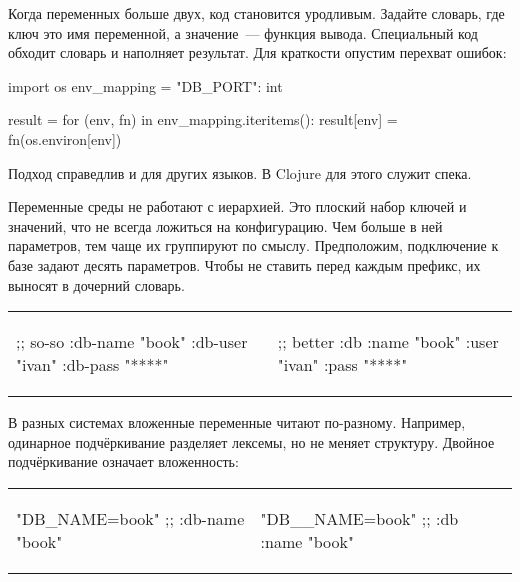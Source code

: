 Когда переменных больше двух, код становится уродливым. Задайте словарь, где
ключ это имя переменной, а значение~--- функция вывода. Специальный код обходит
словарь и наполняет результат. Для краткости опустим перехват ошибок:

\begin{english}
  \begin{python}
import os
env_mapping = {"DB_PORT": int}

result = {}
for (env, fn) in env_mapping.iteritems():
    result[env] = fn(os.environ[env])
  \end{python}
\end{english}

\noindent
Подход справедлив и для других языков. В Clojure для этого служит спека.

Переменные среды не работают с иерархией. Это плоский набор ключей и значений,
что не всегда ложиться на конфигурацию. Чем больше в ней параметров, тем чаще их
группируют по смыслу. Предположим, подключение к базе задают десять
параметров. Чтобы не ставить перед каждым префикс, их выносят в дочерний
словарь.


\noindent
\begin{tabular}{ @{}p{5cm} @{}p{5cm} }

\begin{english}
  \begin{clojure}
;; so-so
{:db-name "book"
 :db-user "ivan"
 :db-pass "****"}
  \end{clojure}
\end{english}

&

\begin{english}
  \begin{clojure}
;; better
{:db {:name "book"
      :user "ivan"
      :pass "****"}}
  \end{clojure}
\end{english}

\end{tabular}

В разных системах вложенные переменные читают по-разному. Например, одинарное
подчёркивание разделяет лексемы, но не меняет структуру. Двойное подчёркивание
означает вложенность:

\noindent
\begin{tabular}{ @{}p{5cm} @{}p{5cm} }

\begin{english}
  \begin{clojure}
"DB_NAME=book"
;; {:db-name "book"}
  \end{clojure}
\end{english}

&

\begin{english}
  \begin{clojure}
"DB__NAME=book"
;; {:db {:name "book"}}
  \end{clojure}
\end{english}

\end{tabular}

